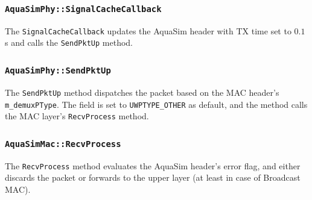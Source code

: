 \documentclass[a4paper]{article}
\begin{document}
\subsubsection{\texttt{AquaSimPhy::SignalCacheCallback}}
The \texttt{SignalCacheCallback} updates the AquaSim header with TX time set to $0.1$ s and calls the \texttt{SendPktUp} method.

\subsubsection{\texttt{AquaSimPhy::SendPktUp}}
The \texttt{SendPktUp} method dispatches the packet based on the MAC header's \texttt{m\_demuxPType}. The field is set to \texttt{UWPTYPE\_OTHER} as default, and the method calls the MAC layer's \texttt{RecvProcess} method.

\subsubsection{\texttt{AquaSimMac::RecvProcess}}
The \texttt{RecvProcess} method evaluates the AquaSim header's error flag, and either discards the packet or forwards to the upper layer (at least in case of Broadcast MAC).


\printbibliography
\end{document}
